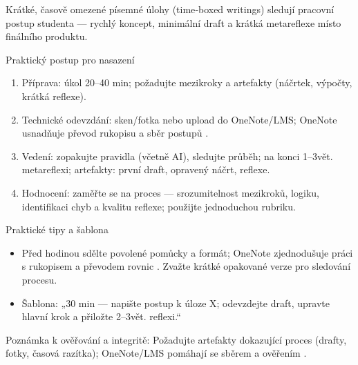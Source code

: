 Krátké, časově omezené písemné úlohy (time‑boxed writings) sledují pracovní postup studenta — rychlý koncept, minimální draft a krátká metareflexe místo finálního produktu.

Praktický postup pro nasazení
\begin{enumerate}
\item Příprava: úkol 20–40 min; požadujte mezikroky a artefakty (náčrtek, výpočty, krátká reflexe).
\item Technické odevzdání: sken/fotka nebo upload do OneNote/LMS; OneNote usnadňuje převod rukopisu a sběr postupů \cite{kb_ai_101_tipu_pdf_04e4a115_page_8_1}.
\item Vedení: zopakujte pravidla (včetně AI), sledujte průběh; na konci 1–3vět. metareflexi; artefakty: první draft, opravený náčrt, reflexe.
\item Hodnocení: zaměřte se na proces — srozumitelnost mezikroků, logiku, identifikaci chyb a kvalitu reflexe; použijte jednoduchou rubriku.
\end{enumerate}

Praktické tipy a šablona
\begin{itemize}
\item Před hodinou sdělte povolené pomůcky a formát; OneNote zjednodušuje práci s rukopisem a převodem rovnic \cite{kb_ai_101_tipu_pdf_04e4a115_page_8_1}. Zvažte krátké opakované verze pro sledování procesu.
\item Šablona: „30 min — napište postup k úloze X; odevzdejte draft, upravte hlavní krok a přiložte 2–3vět. reflexi.“
\end{itemize}

Poznámka k ověřování a integritě: Požadujte artefakty dokazující proces (drafty, fotky, časová razítka); OneNote/LMS pomáhají se sběrem a ověřením \cite{kb_ai_101_tipu_pdf_04e4a115_page_8_1}.